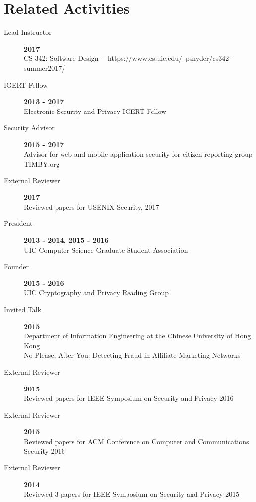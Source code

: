 \documentclass{vitae}
\begin{document}
  \section{Related Activities}
  \begin{description}

    \item[Lead Instructor] \hfill \textbf{2017}\\
    CS 342: Software Design – https://www.cs.uic.edu/~psnyder/cs342-summer2017/

    \item[IGERT Fellow] \hfill \textbf{2013 - 2017}\\
    Electronic Security and Privacy IGERT Fellow

    \item[Security Advisor] \hfill \textbf{2015 - 2017}\\
    Advisor for web and mobile application security for citizen reporting group TIMBY.org

    \item[External Reviewer] \hfill \textbf{2017}\\
    Reviewed papers for USENIX Security, 2017

    \item[President] \hfill \textbf{2013 - 2014, 2015 - 2016}\\
    UIC Computer Science Graduate Student Association

    \item[Founder] \hfill \textbf{2015 - 2016}\\
    UIC Cryptography and Privacy Reading Group

    \item[Invited Talk] \hfill \textbf{2015}\\
    Department of Information Engineering at the Chinese University of Hong Kong\\
    No Please, After You: Detecting Fraud in Affiliate Marketing Networks

    \item[External Reviewer] \hfill \textbf{2015}\\
    Reviewed papers for IEEE Symposium on Security and Privacy 2016

    \item[External Reviewer] \hfill \textbf{2015}\\
    Reviewed papers for ACM Conference on Computer and Communications Security 2016

    \item[External Reviewer] \hfill \textbf{2014}\\
    Reviewed 3 papers for IEEE Symposium on Security and Privacy 2015


\end{description}
\end{document}

